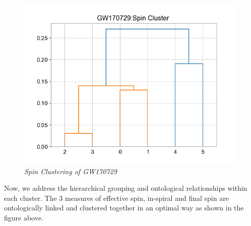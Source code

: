     \begin{figure}[H]
        \centering
        \includegraphics[width=1.0\linewidth]{images/61_17_GW170729 Spin Cluster.png}
        \caption{\textit{Spin Clustering of GW170729}}
        \label{fig:LIGO9_PlaceHolder_fig}
    \end{figure}

Now, we address the hierarchical grouping and ontological relationships within each cluster. The 3 measures of effective spin, in-spiral and final spin are ontologically linked and clustered together in an optimal way as shown in the figure above.


